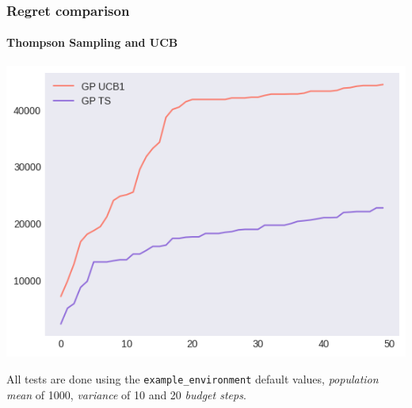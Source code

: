 \begin{frame}[plain]

\frametitle{Regret comparison}
\framesubtitle{Thompson Sampling and UCB}

\begin{center}
	\hspace*{-2.8em}
	\includegraphics[scale=0.55]{img/Graphs/uncertain_alpha/image3.png}
\end{center}

\scriptsize All tests are done using the \texttt{example\_environment} default values, \textit{population mean} of 1000, \textit{variance} of 10 and 20 \textit{budget steps}.

\end{frame}



